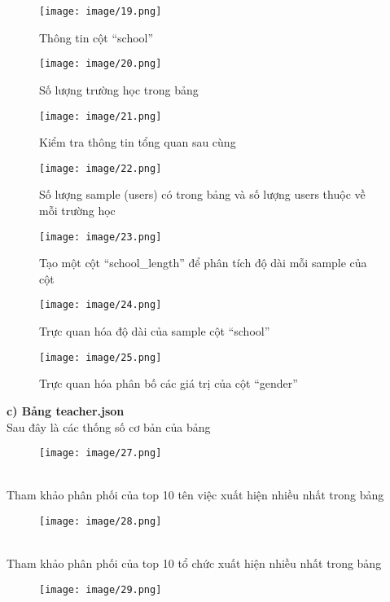 \newpage
\begin{figure}
    \centering
    \texttt{[image: image/19.png]}
    \caption{Thông tin cột “school”}
\end{figure}
\begin{figure}[h]
    \centering
    \texttt{[image: image/20.png]}
    \caption{Số lượng trường học trong bảng}
\end{figure}
\begin{figure}[h]
    \centering
    \texttt{[image: image/21.png]}
    \caption{Kiểm tra thông tin tổng quan sau cùng}
\end{figure}
\newpage
\begin{figure}
    \centering
    \texttt{[image: image/22.png]}
    \caption{Số lượng sample (users) có trong bảng và số lượng users thuộc về mỗi trường học}
\end{figure}
\begin{figure}[h]
    \centering
    \texttt{[image: image/23.png]}
    \caption{Tạo một cột “school\_length” để phân tích độ dài mỗi sample của cột}
\end{figure}
\newpage
\begin{figure}
    \centering
    \texttt{[image: image/24.png]}
    \caption{Trực quan hóa độ dài của sample cột “school”}
\end{figure}
\begin{figure}[h]
    \centering
    \texttt{[image: image/25.png]}
    \caption{Trực quan hóa phân bố các giá trị của cột “gender”}
\end{figure}
\newpage
\textbf{c) Bảng teacher.json}\\
Sau đây là các thống số cơ bản của bảng
\begin{figure}[h]
    \centering
    \texttt{[image: image/27.png]}
\end{figure}\\
Tham khảo phân phối của top 10 tên việc xuất hiện nhiều nhất trong bảng
\begin{figure}[h]
    \centering
    \texttt{[image: image/28.png]}
\end{figure}\\
Tham khảo phân phối của top 10 tổ chức xuất hiện nhiều nhất trong bảng
\newpage
\begin{figure}
    \centering
    \texttt{[image: image/29.png]}
\end{figure}
